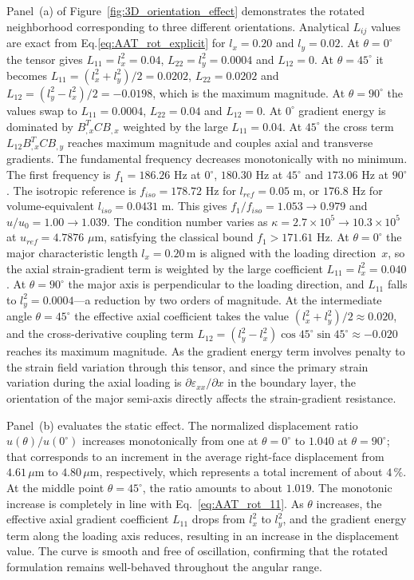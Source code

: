 \documentclass[final,3p,times,fleqn]{elsarticle}
\begin{document}
Panel~(a) of Figure~\ref{fig:3D_orientation_effect} demonstrates the 
rotated neighborhood corresponding to three different orientations.
Analytical $L_{ij}$ values are exact from Eq.\ref{eq:AAT_rot_explicit} for $l_x=0.20$ and $l_y=0.02$. At $\theta=0^\circ$ the tensor gives $L_{11}=l_x^2=0.04$, $L_{22}=l_y^2=0.0004$ and $L_{12}=0$. At $\theta=45^\circ$ it becomes $L_{11}=(l_x^2+l_y^2)/2=0.0202$, $L_{22}=0.0202$ and $L_{12}=(l_y^2-l_x^2)/2=-0.0198$, which is the maximum magnitude. At $\theta=90^\circ$ the values swap to $L_{11}=0.0004$, $L_{22}=0.04$ and $L_{12}=0$. At $0^\circ$ gradient energy is dominated by $B_{,x}^T C B_{,x}$ weighted by the large $L_{11}=0.04$. At $45^\circ$ the cross term $L_{12} B_{,x}^T C B_{,y}$ reaches maximum magnitude and couples axial and transverse gradients. The fundamental frequency decreases monotonically with no minimum. The first frequency is $f_1=186.26$ Hz at $0^\circ$, $180.30$ Hz at $45^\circ$ and $173.06$ Hz at $90^\circ$. The isotropic reference is $f_{iso}=178.72$ Hz for $l_{ref}=0.05$ m, or $176.8$ Hz for volume-equivalent $l_{iso}=0.0431$ m. This gives $f_1/f_{iso}=1.053\to0.979$ and $u/u_0=1.00\to1.039$. The condition number varies as $\kappa=2.7\times10^5\to10.3\times10^5$ at $u_{ref}=4.7876$ $\mu$m, satisfying the classical bound $f_1>171.61$ Hz.
At $\theta = 0^{\circ}$ the major characteristic length $l_{x} = 0.20$\,m is
aligned with the loading direction~$x$, so the axial strain-gradient
term is weighted by the large coefficient
$L_{11} = l_{x}^{2} = 0.040$.
At $\theta = 90^{\circ}$ the major axis is perpendicular to the loading
direction, and $L_{11}$ falls to
$l_{y}^{2} = 0.0004$---a reduction by two orders of magnitude.
At the intermediate angle $\theta = 45^{\circ}$ the effective axial
coefficient takes the value
$(l_{x}^{2}+l_{y}^{2})/2 \approx 0.020$, and the cross-derivative
coupling term
$L_{12}
= (l_{y}^{2}-l_{x}^{2})\cos 45^{\circ}\sin 45^{\circ}
\approx -0.020$
reaches its maximum magnitude.
As the gradient energy term involves penalty to the strain field
variation through this tensor, and since the primary strain variation
during the axial loading is $\partial \varepsilon_{xx} / \partial x$ in the
boundary layer, the orientation of the major semi-axis directly
affects the strain-gradient resistance.

Panel~(b) evaluates the static effect.
The normalized displacement ratio $u(\theta)/u(0^{\circ})$ increases
monotonically from one at $\theta = 0^{\circ}$ to $1.040$ at
$\theta = 90^{\circ}$; that corresponds to an increment in the average
right-face displacement from $4.61\,\mu$m to $4.80\,\mu$m,
respectively, which represents a total increment of about $4\,\%$.
At the middle point $\theta = 45^{\circ}$, the ratio amounts to about $1.019$.
The monotonic increase is completely in line with
Eq.~\eqref{eq:AAT_rot_11}. As $\theta$ increases, the effective axial gradient coefficient $L_{11}$
drops from $l_{x}^{2}$ to $l_{y}^{2}$, and the gradient energy term along the loading axis reduces, resulting in an increase in the displacement value.
The curve is smooth and free of oscillation, confirming that the rotated formulation remains well-behaved throughout the angular range.
\end{document}
